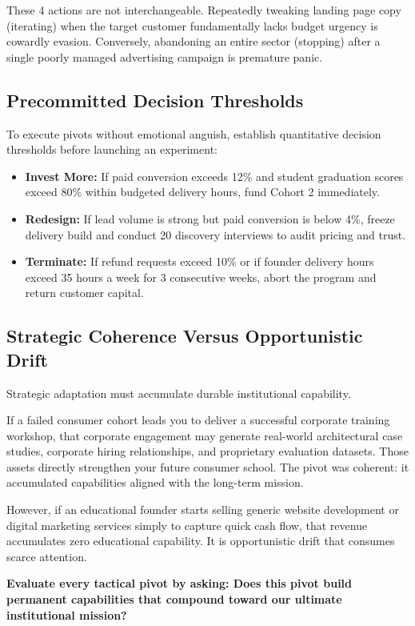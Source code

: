These 4 actions are not interchangeable. Repeatedly tweaking landing page copy (iterating) when the target customer fundamentally lacks budget urgency is cowardly evasion. Conversely, abandoning an entire sector (stopping) after a single poorly managed advertising campaign is premature panic.

\subsection{Precommitted Decision Thresholds}

To execute pivots without emotional anguish, establish quantitative decision thresholds before launching an experiment:
\begin{itemize}[leftmargin=10pt,itemsep=1pt,topsep=1pt]
  \item \textbf{Invest More:} If paid conversion exceeds 12\% and student graduation scores exceed 80\% within budgeted delivery hours, fund Cohort 2 immediately.
  \item \textbf{Redesign:} If lead volume is strong but paid conversion is below 4\%, freeze delivery build and conduct 20 discovery interviews to audit pricing and trust.
  \item \textbf{Terminate:} If refund requests exceed 10\% or if founder delivery hours exceed 35 hours a week for 3 consecutive weeks, abort the program and return customer capital.
\end{itemize}

\subsection{Strategic Coherence Versus Opportunistic Drift}

Strategic adaptation must accumulate durable institutional capability.

If a failed consumer cohort leads you to deliver a successful corporate training workshop, that corporate engagement may generate real-world architectural case studies, corporate hiring relationships, and proprietary evaluation datasets. Those assets directly strengthen your future consumer school. The pivot was coherent: it accumulated capabilities aligned with the long-term mission.

However, if an educational founder starts selling generic website development or digital marketing services simply to capture quick cash flow, that revenue accumulates zero educational capability. It is opportunistic drift that consumes scarce attention.

\textbf{Evaluate every tactical pivot by asking: Does this pivot build permanent capabilities that compound toward our ultimate institutional mission?}

